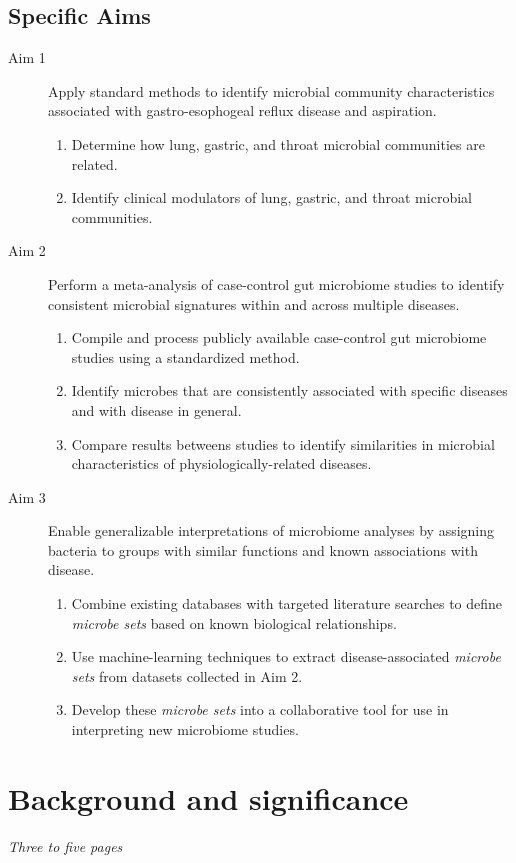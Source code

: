 \documentclass[12pt]{article}
\begin{document}
\subsection{Specific Aims}
\begin{description}
	\item[Aim 1] Apply standard methods to identify microbial community characteristics associated with gastro-esophogeal reflux disease and aspiration.
		\begin{enumerate}
			\item Determine how lung, gastric, and throat microbial communities are related.
			\item Identify clinical modulators of lung, gastric, and throat microbial communities.
		\end{enumerate}
	\item[Aim 2] Perform a meta-analysis of case-control gut microbiome studies to identify consistent microbial signatures within and across multiple diseases.
	\begin{enumerate}
		\item Compile and process publicly available case-control gut microbiome studies using a standardized method.
		\item Identify microbes that are consistently associated with specific diseases and with disease in general.
		\item Compare results betweens studies to identify similarities in microbial characteristics of physiologically-related diseases.
	\end{enumerate}
	\item[Aim 3] Enable generalizable interpretations of microbiome analyses by assigning bacteria to groups with similar functions and known associations with disease.
	\begin{enumerate}
	\item Combine existing databases with targeted literature searches to define \textit{microbe sets} based on known biological relationships.
	\item Use machine-learning techniques to extract disease-associated \textit{microbe sets} from datasets collected in Aim 2.
	\item Develop these \textit{microbe sets} into a collaborative tool for use in interpreting new microbiome studies.
	\end{enumerate}
\end{description}
\newpage

\section{Background and significance}
\textit{Three to five pages}
\end{document}

